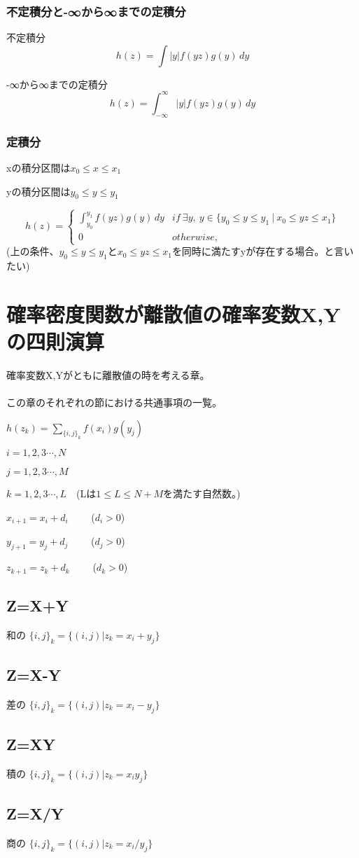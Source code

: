 \documentclass[a4paper,11pt]{ltjsarticle}
\begin{document}
\subsubsection{不定積分と-∞から∞までの定積分}
不定積分
$$
    h(z) = \int |y| f(yz) g(y)\,dy
$$

-∞から∞までの定積分
$$
    h(z) = \int_{-\infty}^{\infty} |y| f(yz) g(y)\,dy
$$
\subsubsection{定積分}
\begin{description}
    \item xの積分区間は$x_0 \leq x \leq x_1$
    \item yの積分区間は$y_0 \leq y \leq y_1$
\end{description}
$$
    h(z)=
    \begin{cases}
        \int_{y_0}^{y_1} f(yz) g(y)\,dy   & if\ \exists y,\  y\in \{ y_0 \leq y \leq y_1 \ | \ x_0 \leq yz \leq x_1 \}\\
        0                                   & otherwise,
    \end{cases}
$$
(上の条件、$y_0 \leq y \leq y_1$と$x_0 \leq yz \leq x_1$を同時に満たすyが存在する場合。と言いたい)
\newpage


\section{確率密度関数が離散値の確率変数X,Yの四則演算}
確率変数X,Yがともに離散値の時を考える章。\\
\\

この章のそれぞれの節における共通事項の一覧。
\begin{description}
    \item $h(z_k) = \sum_{\{i,j\}_k} f(x_i) g(y_j)$
    \item $i=1,2,3\cdots,N$
    \item $j=1,2,3\cdots,M$
    \item $k=1,2,3\cdots,L$\ \ (Lは$1\leq L \leq N+M$を満たす自然数。)
    \item $x_{i+1}=x_i+d_i$ \ \ \ \ ($d_i>0$)
    \item $y_{j+1}=y_j+d_j$ \ \ \ \ ($d_j>0$)
    \item $z_{k+1}=z_k+d_k$ \ \ \ \ ($d_k>0$)
\end{description}

\subsection{Z=X+Y}
和の
$\{ i,j \}_k = \{ (i,j) | z_k = x_i + y_j \}$

\subsection{Z=X-Y}
差の
$\{ i,j \}_k = \{ (i,j) | z_k = x_i - y_j \}$

\subsection{Z=XY}
積の
$\{ i,j \}_k = \{ (i,j) | z_k = x_i y_j \}$

\subsection{Z=X/Y}
商の
$\{ i,j \}_k = \{ (i,j) | z_k = x_i / y_j \}$
\end{document}
